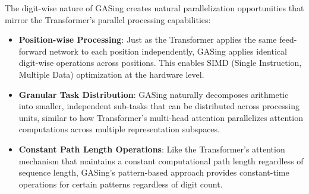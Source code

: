 The digit-wise nature of GASing creates natural parallelization opportunities that mirror the Transformer's parallel processing capabilities:
\begin{itemize}
\item \textbf{Position-wise Processing}: Just as the Transformer applies the same feed-forward network to each position independently, GASing applies identical digit-wise operations across positions. This enables SIMD (Single Instruction, Multiple Data) optimization at the hardware level.
\item \textbf{Granular Task Distribution}: GASing naturally decomposes arithmetic into smaller, independent sub-tasks that can be distributed across processing units, similar to how Transformer's multi-head attention parallelizes attention computations across multiple representation subspaces.
\item \textbf{Constant Path Length Operations}: Like the Transformer's attention mechanism that maintains a constant computational path length regardless of sequence length, GASing's pattern-based approach provides constant-time operations for certain patterns regardless of digit count.

\end{itemize}
